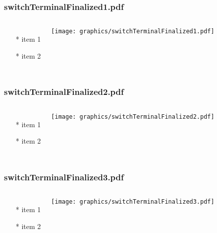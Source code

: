 \documentclass{beamer}
\begin{document}
\begin{frame} \frametitle{switchTerminalFinalized1.pdf}
    \begin{columns}[c]
        \begin{itemize}
            \item[*] item 1
            \item[*] item 2
        \end{itemize}
        \begin{minipage}{\linewidth}
            \begin{center}
            \texttt{[image: graphics/switchTerminalFinalized1.pdf]}
            \label{gfx:switchTerminalFinalized1.pdf}
            \end{center}
        \end{minipage}
    \end{columns}
\end{frame}
\begin{frame} \frametitle{switchTerminalFinalized2.pdf}
    \begin{columns}[c]
        \begin{itemize}
            \item[*] item 1
            \item[*] item 2
        \end{itemize}
        \begin{minipage}{\linewidth}
            \begin{center}
            \texttt{[image: graphics/switchTerminalFinalized2.pdf]}
            \label{gfx:switchTerminalFinalized2.pdf}
            \end{center}
        \end{minipage}
    \end{columns}
\end{frame}
\begin{frame} \frametitle{switchTerminalFinalized3.pdf}
    \begin{columns}[c]
        \begin{itemize}
            \item[*] item 1
            \item[*] item 2
        \end{itemize}
        \begin{minipage}{\linewidth}
            \begin{center}
            \texttt{[image: graphics/switchTerminalFinalized3.pdf]}
            \label{gfx:switchTerminalFinalized3.pdf}
            \end{center}
        \end{minipage}
    \end{columns}
\end{frame}
\end{document}
